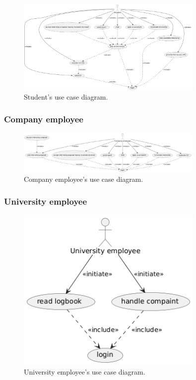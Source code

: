     \begin{figure}[H]
        \centering
        \includegraphics[width=0.8\textwidth]{RASD/Assets/UseCaseDiagram/student.png}
        \caption{Student's use case diagram.}
        \label{fig:Student's use case diagram}
    \end{figure}

\subsubsection{Company employee}

    \begin{figure}[H]
        \centering
        \includegraphics[width=0.8\textwidth]{RASD/Assets/UseCaseDiagram/company.png}
        \caption{Company employee's use case diagram.}
        \label{fig:Company employee's use case diagram}
    \end{figure}

\subsubsection{University employee}

    \begin{figure}[H]
        \centering
        \includegraphics[width=0.8\textwidth]{RASD/Assets/UseCaseDiagram/university.png}
        \caption{University employee's use case diagram.}
        \label{fig:University employee's use case diagram}
    \end{figure}

